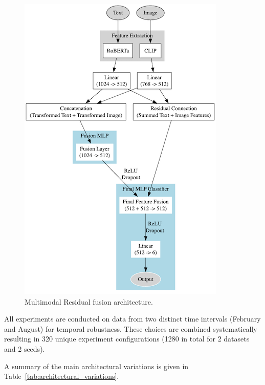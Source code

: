 \begin{figure}[ht]
    \centering
    \includegraphics[height=0.6\textheight]{images/residual.png}
    \caption{Multimodal Residual fusion architecture.}
    \label{fig:residual}
\end{figure}



All experiments are conducted on data from two distinct time intervals (February and August) for temporal robustness. These choices are combined systematically resulting in 320 unique experiment configurations (1280 in total for 2 datasets and 2 seeds).
\newline


A summary of the main architectural variations is given in Table~\ref{tab:architectural_variations}.
\newline

